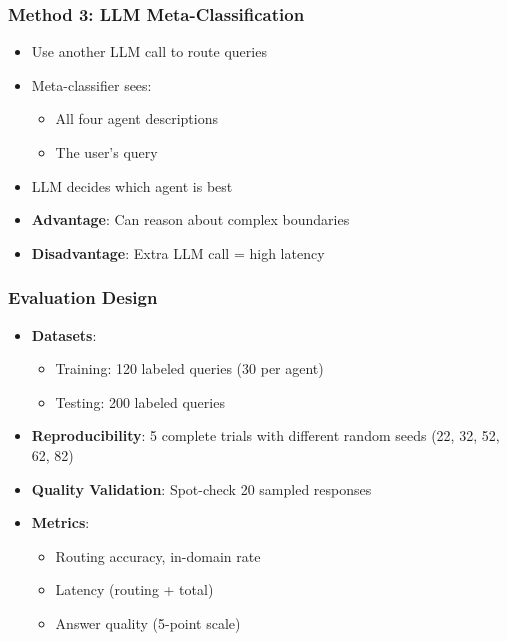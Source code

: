 \documentclass{beamer}
\begin{document}
\begin{frame}
\frametitle{Method 3: LLM Meta-Classification}
\begin{itemize}
    \item Use another LLM call to route queries
    \pause
    \item Meta-classifier sees:
    \begin{itemize}
        \item All four agent descriptions
        \item The user's query
    \end{itemize}
    \pause
    \item LLM decides which agent is best
    \pause
    \item \textbf{Advantage}: Can reason about complex boundaries
    \item \textbf{Disadvantage}: Extra LLM call = high latency
\end{itemize}
\end{frame}

\begin{frame}
\frametitle{Evaluation Design}
\begin{itemize}
    \item \textbf{Datasets}:
    \begin{itemize}
        \item Training: 120 labeled queries (30 per agent)
        \item Testing: 200 labeled queries
    \end{itemize}
    \pause
    \item \textbf{Reproducibility}: 5 complete trials with different random seeds (22, 32, 52, 62, 82)
    \pause
    \item \textbf{Quality Validation}: Spot-check 20 sampled responses
    \pause
    \item \textbf{Metrics}:
    \begin{itemize}
        \item Routing accuracy, in-domain rate
        \item Latency (routing + total)
        \item Answer quality (5-point scale)
    \end{itemize}
\end{itemize}
\end{frame}
\end{document}
